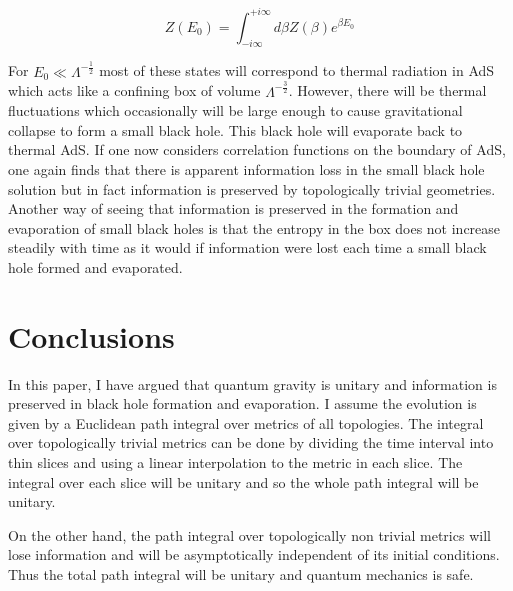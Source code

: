 \documentclass[aps,prd,groupedaddress,showpacs,12pt,nofootinbib]{revtex4-1}
\begin{document}
\begin{equation}
Z(E_0)=\int_{-i\infty}^{+i\infty}d\beta Z(\beta)e^{\beta E_0}
\end{equation}

For $E_0 \ll \Lambda^{-\frac{1}{2}}$ most of these states will correspond to thermal radiation in AdS which acts like a confining box of volume $\Lambda^{-\frac{3}{2}}$. However, there will be thermal fluctuations which occasionally will be large enough to cause gravitational collapse to form a small black hole. This black hole will evaporate back to thermal AdS. If one now considers correlation functions on the boundary of AdS, one again finds that there is apparent information loss in the small black hole solution but in fact information is preserved by topologically trivial geometries. Another way of seeing that information is preserved in the formation and evaporation of small black holes is that the entropy in the box does not increase steadily with time as it would if information were lost each time a small black hole formed and evaporated. 


\section{Conclusions}

In this paper, I have argued that quantum gravity is unitary and information is preserved in black hole formation and evaporation. I assume the evolution is given by a Euclidean path integral over metrics of all topologies. The integral over topologically trivial metrics can be done by dividing the time interval into thin slices and using a linear interpolation to the metric in each slice. The integral over each slice will be unitary and so the whole path integral will be unitary. 

On the other hand, the path integral over topologically non trivial metrics will lose information and will be asymptotically independent of its initial conditions. Thus the total path integral will be unitary and quantum mechanics is safe. 
\end{document}
